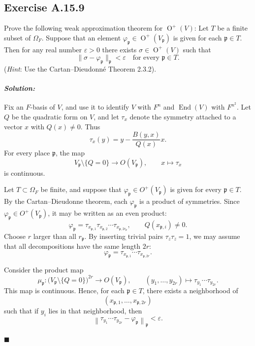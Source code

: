 \documentclass[12pt, a4paper]{article}
\newenvironment{solution}
  {\paragraph{\textit{Solution:}}\par\medskip}
  {\hfill$\blacksquare$\vspace{0.1cm}}
\begin{document}
\subsection*{Exercise A.15.9}
Prove the following weak approximation theorem for $\operatorname{O}^+(V)$: Let $T$ be a finite subset of $\Omega_F$. Suppose that an element $\varphi_{\mathfrak{p}} \in \operatorname{O}^+(V_{\mathfrak{p}})$ is given for each $\mathfrak{p} \in T$. Then for any real number $\varepsilon > 0$ there exists $\sigma \in \operatorname{O}^+(V)$ such that
\[ \| \sigma - \varphi_{\mathfrak{p}} \|_{\mathfrak{p}} < \varepsilon \quad \text{for every } \mathfrak{p} \in T . \]
(\textit{Hint}: Use the Cartan--Dieudonné Theorem 2.3.2).
\begin{solution}
Fix an \(F\)-basis of \(V\), and use it to identify \(V\) with \(F^n\) and
\(\operatorname{End}(V)\) with \(F^{n^2}\). Let \(Q\) be the quadratic form on
\(V\), and let \(\tau_x\) denote the symmetry attached to a vector \(x\) with
\(Q(x)\neq 0\). Thus
\[
\tau_x(y)=y-\frac{B(y,x)}{Q(x)}x .
\]
For every place \(\mathfrak p\), the map
\[
V_{\mathfrak p}\setminus \{Q=0\}\longrightarrow O(V_{\mathfrak p}),
\qquad
x\longmapsto \tau_x
\]
is continuous.

Let \(T\subset \Omega_F\) be finite, and suppose that
\(\varphi_{\mathfrak p}\in O^+(V_{\mathfrak p})\) is given for every
\(\mathfrak p\in T\). By the Cartan--Dieudonne theorem, each
\(\varphi_{\mathfrak p}\) is a product of symmetries. Since
\(\varphi_{\mathfrak p}\in O^+(V_{\mathfrak p})\), it may be written as an even
product:
\[
\varphi_{\mathfrak p}
=
\tau_{x_{\mathfrak p,1}}\tau_{x_{\mathfrak p,2}}
\cdots
\tau_{x_{\mathfrak p,2r_{\mathfrak p}}},
\qquad
Q(x_{\mathfrak p,i})\neq 0.
\]
Choose \(r\) larger than all \(r_{\mathfrak p}\). By inserting trivial pairs
\(\tau_z\tau_z=1\), we may assume that all decompositions have the same length
\(2r\):
\[
\varphi_{\mathfrak p}
=
\tau_{x_{\mathfrak p,1}}\cdots \tau_{x_{\mathfrak p,2r}} .
\]

Consider the product map
\[
\mu_{\mathfrak p}:
\bigl(V_{\mathfrak p}\setminus\{Q=0\}\bigr)^{2r}
\longrightarrow O(V_{\mathfrak p}),
\qquad
(y_1,\dots,y_{2r})
\longmapsto
\tau_{y_1}\cdots \tau_{y_{2r}} .
\]
This map is continuous. Hence, for each \(\mathfrak p\in T\), there exists a
neighborhood of
\[
(x_{\mathfrak p,1},\dots,x_{\mathfrak p,2r})
\]
such that if \(y_i\) lies in that neighborhood, then
\[
\left\|
\tau_{y_1}\cdots\tau_{y_{2r}}-\varphi_{\mathfrak p}
\right\|_{\mathfrak p}<\varepsilon .
\]


\end{solution}
\end{document}
